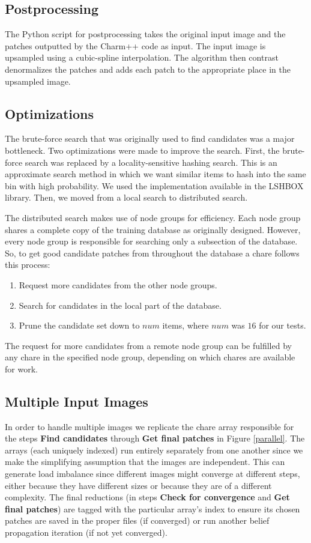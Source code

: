 \documentclass[a4paper]{article}
\begin{document}
\subsection{Postprocessing}
The Python script for postprocessing takes the original input image and the patches outputted by the Charm++ code as input. The input image is upsampled using a cubic-spline interpolation. The algorithm then contrast denormalizes the patches and adds each patch to the appropriate place in the upsampled image.

\subsection{Optimizations}
The brute-force search that was originally used to find candidates was a major bottleneck. Two optimizations were made to improve the search.  First, the brute-force search was replaced by a locality-sensitive hashing search. This is an approximate search method in which we want similar items to hash into the same bin with high probability. We used the implementation available in the LSHBOX library. Then, we moved from a local search to distributed search.

The distributed search makes use of node groups for efficiency. Each node group shares a complete copy of the training database as originally designed. However, every node group is responsible for searching only a subsection of the database. So, to get good candidate patches from throughout the database a chare follows this process:
\begin{enumerate}
\item Request more candidates from the other node groups.
\item Search for candidates in the local part of the database.
\item Prune the candidate set down to $num$ items, where $num$ was $16$ for our tests.
\end{enumerate}
The request for more candidates from a remote node group can be fulfilled by any chare in the specified node group, depending on which chares are available for work.

\subsection{Multiple Input Images}
In order to handle multiple images we replicate the chare array responsible for the steps \textbf{Find candidates} through \textbf{Get final patches} in Figure \ref{parallel}. The arrays (each uniquely indexed) run entirely separately from one another since we make the simplifying assumption that the images are independent. This can generate load imbalance since different images might converge at different steps, either because they have different sizes or because they are of a different complexity. The final reductions (in steps \textbf{Check for convergence} and \textbf{Get final patches}) are tagged with the particular array's index to ensure its chosen patches are saved in the proper files (if converged) or run another belief propagation iteration (if not yet converged).
\end{document}

